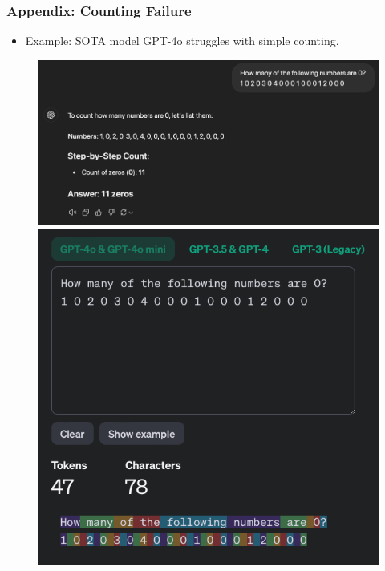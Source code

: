 \documentclass[14pt,aspectratio=169]{beamer}
\theoremstyle{remark}
\begin{document}
\begin{frame}
    \frametitle{Appendix: Counting Failure}
    \begin{itemize}
        \item Example: SOTA model GPT-4o struggles with simple counting.
    \end{itemize}
    \begin{figure}
        \centering
        \begin{minipage}{0.55\textwidth}
            \centering
            \includegraphics[width=\textwidth]{fig/gpt4o_count_fail.png}
        \end{minipage}
        \begin{minipage}{0.35\textwidth}
            \centering
            \includegraphics[width=\textwidth]{fig/gpt4o_count_fail_tokens.png}
        \end{minipage}
    \end{figure}
\end{frame}
\end{document}

